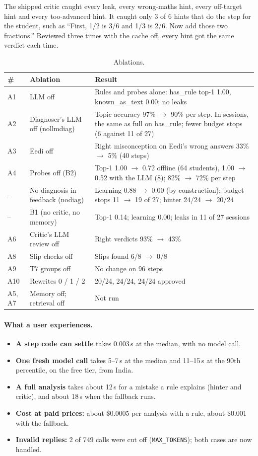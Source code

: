 \documentclass[11pt,a4paper]{article}
\newcommand{\code}[1]{\texttt{#1}}
\newcommand{\grp}[1]{\textsf{#1}}
\newcommand{\cond}[1]{\textsf{#1}}
\begin{document}
The shipped critic caught every leak, every wrong-maths hint, every off-target hint and every too-advanced hint. It caught only 3 of 6 hints that do the step for the student, such as ``First, 1/2 is 3/6 and 1/3 is 2/6. Now add those two fractions.'' Reviewed three times with the cache off, every hint got the same verdict each time.
\begin{table}[H]
\centering\small
\begin{tabularx}{\linewidth}{@{}lP{3.3cm}Y@{}}
\toprule
\# & Ablation & Result \\
\midrule
A1 & LLM off & Rules and probes alone: \grp{has\_rule} top-1 1.00, \grp{known\_as\_text} 0.00; no leaks \\
A2 & Diagnoser's LLM off (\cond{nollmdiag}) & Topic accuracy 97\% $\to$ 90\% per step. In sessions, the same as full on \grp{has\_rule}; fewer budget stops (6 against 11 of 27) \\
A3 & Eedi off & Right misconception on Eedi's wrong answers 33\% $\to$ 5\% (40 steps) \\
A4 & Probes off (B2) & Top-1 1.00 $\to$ 0.72 offline (64 students), 1.00 $\to$ 0.52 with the LLM (8); 82\% $\to$ 72\% per step \\
-- & No diagnosis in feedback (\cond{nodiag}) & Learning 0.88 $\to$ 0.00 (by construction); budget stops 11 $\to$ 19 of 27; hinter 24/24 $\to$ 20/24 \\
-- & B1 (no critic, no memory) & Top-1 0.14; learning 0.00; leaks in 11 of 27 sessions \\
A6 & Critic's LLM review off & Right verdicts 93\% $\to$ 43\% \\
A8 & Slip checks off & Slips found 6/8 $\to$ 0/8 \\
A9 & T7 groups off & No change on 96 steps \\
A10 & Rewrites 0 / 1 / 2 & 20/24, 24/24, 24/24 approved \\
A5, A7 & Memory off; retrieval off & Not run \\
\bottomrule
\end{tabularx}
\caption{Ablations.}
\end{table}
\paragraph{What a user experiences.}
\begin{itemize}
  \item \textbf{A step code can settle} takes 0.003\,s at the median, with no model call.
  \item \textbf{One fresh model call} takes 5--7\,s at the median and 11--15\,s at the 90th percentile, on the free tier, from India.
  \item \textbf{A full analysis} takes about 12\,s for a mistake a rule explains (hinter and critic), and about 18\,s when the fallback runs.
  \item \textbf{Cost at paid prices:} about \$0.0005 per analysis with a rule, about \$0.001 with the fallback.
  \item \textbf{Invalid replies:} 2 of 749 calls were cut off (\code{MAX\_TOKENS}); both cases are now handled.
\end{itemize}
\end{document}
